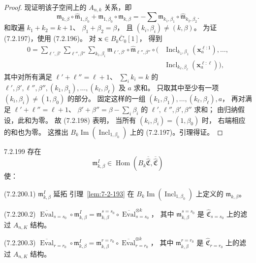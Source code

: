 \begin{proof}
现证明该子空间上的 $A_{n,k}$ 关系，即
\begin{equation}
\mathfrak m_{k,\beta}\circ
\widehat{\mathfrak m}_{1,\beta_0}
+\mathfrak m_{1,\beta_0}\circ
\mathfrak m_{k,\beta}
=-\sum
\mathfrak m_{k_1,\beta_1}
\circ\widehat{\mathfrak m}_{k_2,\beta_2}.
\tag{7.2.197}\label{eq:7-2-197}
\end{equation}
和取遍 $k_1+k_2=k+1$、
$\beta_1+\beta_2=\beta$，
且 $(k_i,\beta_i)\ne(k,\beta)$。
为证 (7.2.197)，使用 (7.2.196)。
对 $\mathbf x\in B_k\overline C_0[1]$，
得到
\begin{equation}
\begin{aligned}
0=\sum_{\ell',\beta'}
\sum_{\ell'',\beta''}
\sum_{k_i,\beta_i}
\mathfrak m_{\ell',\beta'}
\circ\widehat{\mathfrak m}_{\ell'',\beta''}
\circ\bigl(&\operatorname{Incl}_{k_1,\beta_1}
(\mathbf x_a^{\ell:1}),\ldots,\\
&\operatorname{Incl}_{k_\ell,\beta_\ell}
(\mathbf x_a^{\ell:\ell})\bigr),
\end{aligned}
\tag{7.2.198}\label{eq:7-2-198}
\end{equation}
其中对所有满足
$\ell'+\ell''=\ell+1$、
$\sum_i k_i=k$ 的
$\ell',\beta',\ell'',\beta'',
(k_1,\beta_1),\ldots,(k_\ell,\beta_\ell)$
及 $a$ 求和。
只取其中至少有一项
$(k_i,\beta_i)\ne(1,\beta_0)$ 的部分。
固定这样的一组
$(k_1,\beta_1),\ldots,
(k_\ell,\beta_\ell),a$，
再对满足
$\ell'+\ell''=\ell+1$、
$\beta'+\beta''
=\beta-\sum_i\beta_i$
的 $\ell',\ell'',\beta',\beta''$ 求和；
由归纳假设，此和为零。
故 (7.2.198) 表明，
当所有 $(k_i,\beta_i)=(1,\beta_0)$ 时，
右端相应的和也为零。
这推出 $B_k\operatorname{Im}
(\operatorname{Incl}_{1,\beta_0})$
上的 (7.2.197)。引理得证。
\end{proof}

\begin{lemma}{7.2.199}\label{lem:7-2-199}
存在
\[
\mathfrak m^I_{k,\beta}\in
\operatorname{Hom}
(B_k\overline{\widehat{\mathfrak C}},
\overline{\widehat{\mathfrak C}})
\]
使：

\noindent\textup{(7.2.200.1)}
$\mathfrak m^I_{k,\beta}$ 延拓
引理~\ref{lem:7-2-193}
在 $B_k\operatorname{Im}
(\operatorname{Incl}_{1,\beta_0})$
上定义的 $\mathfrak m_{k,\beta}$。

\noindent\textup{(7.2.200.2)}
$\overline{\operatorname{Eval}}_{s=s_0}
\circ\mathfrak m^I_{k,\beta}
=\mathfrak m^{s=s_0}_{k,\beta}
\circ\overline{\operatorname{Eval}}_{s=s_0}^{\otimes k}$，
其中 $\mathfrak m^{s=s_0}_{k,\beta}$
是 $\widehat{\mathfrak C}_{s=s_0}$
上的滤过 $A_{n,K}$ 结构。

\noindent\textup{(7.2.200.3)}
$\overline{\operatorname{Eval}}_{r=r_0}
\circ\mathfrak m^I_{k,\beta}
=\mathfrak m^{r=r_0}_{k,\beta}
\circ\overline{\operatorname{Eval}}_{r=r_0}^{\otimes k}$，
其中 $\mathfrak m^{r=r_0}_{k,\beta}$
是 $\widehat{\mathfrak C}_{r=r_0}$
上的滤过 $A_{n,K}$ 结构。
\end{lemma}

